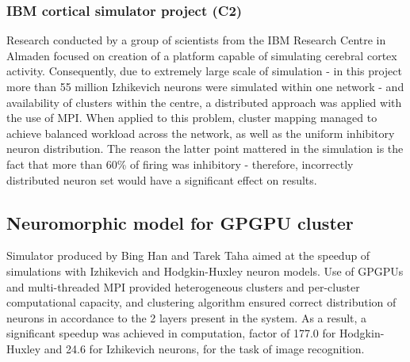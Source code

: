 \subsubsection{IBM cortical simulator project (C2)}
Research conducted by a group of scientists from the IBM Research Centre in Almaden focused on creation of a platform capable of simulating cerebral cortex activity. Consequently, due to extremely large scale of simulation - in this project more than 55 million Izhikevich neurons were simulated within one network - and availability of clusters within the centre, a distributed approach was applied with the use of MPI. When applied to this problem, cluster mapping managed to achieve balanced workload across the network, as well as the uniform inhibitory neuron distribution. The reason the latter point mattered in the simulation is the fact that more than 60\% of firing was inhibitory - therefore, incorrectly distributed neuron set would have a significant effect on results.\cite{DharmendraS.Modha2007}

\subsection{Neuromorphic model for GPGPU cluster}
Simulator produced by Bing Han and Tarek Taha aimed at the speedup of simulations with Izhikevich and Hodgkin-Huxley neuron models. Use of GPGPUs and multi-threaded MPI provided heterogeneous  clusters and per-cluster computational capacity, and clustering algorithm ensured correct distribution of neurons in accordance to the 2 layers present in the system. As a result, a significant speedup was achieved in computation, factor of 177.0 for Hodgkin-Huxley and 24.6 for Izhikevich neurons, for the task of image recognition.\cite{TarekM.Taha2010}
